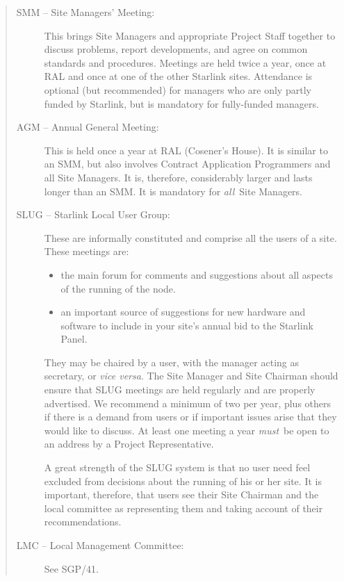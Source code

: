 \documentclass[twoside,11pt]{article}
\newcommand{\xref}[3]{#1}
\begin{document}
\begin{quote}
\begin{description}
\item [SMM -- Site Managers' Meeting:]
 This brings Site Managers and appropriate Project Staff together to discuss
 problems, report  developments, and agree on common standards and procedures.
 Meetings are held twice a year, once at RAL and once at one of the other
 Starlink sites.
 Attendance is optional (but recommended) for managers who are only partly
 funded by Starlink, but is mandatory for fully-funded managers.
\item [AGM -- Annual General Meeting:]
 This is held once a year at RAL (Cosener's House).
 It is similar to an SMM, but also involves Contract Application Programmers and
 all Site Managers.
 It is, therefore, considerably larger and lasts longer than an SMM.
 It is mandatory for {\em all}\, Site Managers.
\item [SLUG -- Starlink Local User Group:]
 These are informally constituted and comprise all the users of a site.
 These meetings are:
 \begin{itemize}
 \item the main forum for comments and suggestions about all aspects of the
  running of the node.
 \item an important source of suggestions for new hardware and software to
  include in your site's annual bid to the Starlink Panel.
 \end{itemize}
 They may be chaired by a user, with the manager acting as secretary, or
 {\it vice versa}.
 The Site Manager and Site Chairman should ensure that SLUG meetings are held
 regularly and are properly advertised.
 We recommend a minimum of two per year, plus others if there is a demand from
 users or if important issues arise that they would like to discuss.
 At least one meeting a year {\em must}\, be open to an address by a Project
 Representative.

 A great strength of the SLUG system is that no user need feel excluded from
 decisions about the running of his or her site.
 It is important, therefore, that users see their Site Chairman and the local
 committee as representing them and taking account of their recommendations.

\item [LMC -- Local Management Committee:]
 See \xref{SGP/41}{sgp41}{}.
\end{description}
\end{quote}
\end{document}

